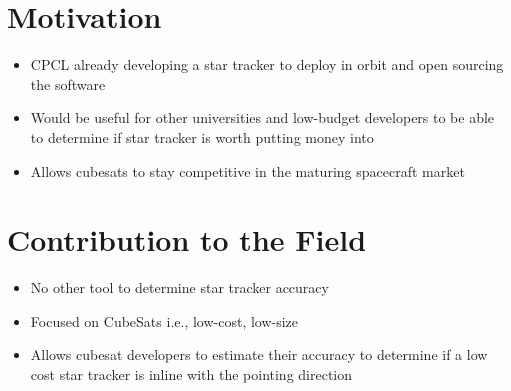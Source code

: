 \section{Motivation}
\begin{itemize}
    \item CPCL already developing a star tracker to deploy in orbit and open sourcing the software 
    \item Would be useful for other universities and low-budget developers to be able to determine if star tracker is worth putting money into 
    \item Allows cubesats to stay competitive in the maturing spacecraft market 
\end{itemize}

\section{Contribution to the Field}
\begin{itemize}
    \item No other tool to determine star tracker accuracy 
    \item Focused on CubeSats i.e., low-cost, low-size 
    \item Allows cubesat developers to estimate their accuracy to determine if a low cost star tracker is inline with the pointing direction
\end{itemize}

